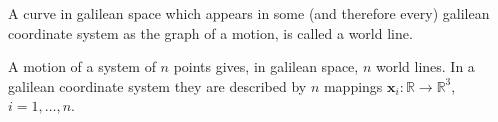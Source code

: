 A curve in galilean space which appears in some (and therefore every) galilean coordinate system as the graph of a motion, is called a world line.

A motion of a system of $n$ points gives, in galilean space, $n$ world lines. In a galilean coordinate system they are described by $n$ mappings $\mathbf{x}_i: \mathbb{R} \rightarrow \mathbb{R}^3$, $i = 1, \ldots, n$.
